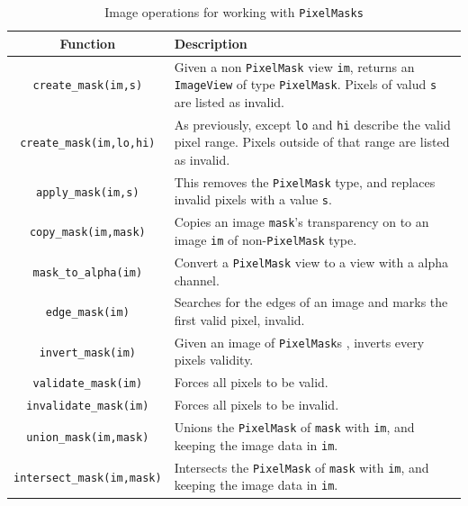 \begin{table}[htb]\begin{centering}
\begin{tabular}{|c|p{5 in}|} \hline
Function & Description \\ \hline \hline
\verb#create_mask(im,s)# & Given a non \verb#PixelMask# view \verb#im#, returns an \verb#ImageView# of type \verb#PixelMask#. Pixels of valud \verb#s# are listed as invalid. \\ \hline 
\verb#create_mask(im,lo,hi)# & As previously, except \verb#lo# and \verb#hi# describe the valid pixel range. Pixels outside of that range are listed as invalid. \\ \hline
\verb#apply_mask(im,s)# & This removes the \verb#PixelMask# type, and replaces invalid pixels with a value \verb#s#. \\ \hline
\verb#copy_mask(im,mask)# & Copies an image \verb#mask#'s transparency on to an image \verb#im# of non-\verb#PixelMask# type. \\ \hline
\verb#mask_to_alpha(im)# & Convert a \verb#PixelMask# view to a view with a alpha channel. \\ \hline
\verb#edge_mask(im)# & Searches for the edges of an image and marks the first valid pixel, invalid. \\ \hline
\verb#invert_mask(im)# & Given an image of \verb#PixelMask#s , inverts every pixels validity. \\ \hline
\verb#validate_mask(im)# & Forces all pixels to be valid. \\ \hline
\verb#invalidate_mask(im)# & Forces all pixels to be invalid. \\ \hline
\verb#union_mask(im,mask)# & Unions the \verb#PixelMask# of \verb#mask# with \verb#im#, and keeping the image data in \verb#im#. \\ \hline
\verb#intersect_mask(im,mask)# & Intersects the \verb#PixelMask# of \verb#mask# with \verb#im#, and keeping the image data in \verb#im#. \\ \hline
\end{tabular}
\caption{Image operations for working with {\tt PixelMasks}}
\label{tbl:pixel-mask-image-ops}
\end{centering}
\end{table}

